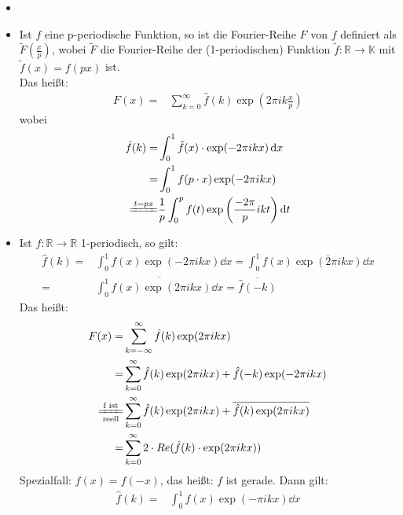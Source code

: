 \begin{Bemerkung}{
	\begin{itemize}
		\item[ ]
		\item Ist $f$ eine p-periodische Funktion, so ist die Fourier-Reihe $F$ 
		von $f$ definiert als $\tilde{F}(\frac{x}{p})$, wobei $\tilde{F}$ die 
		Fourier-Reihe der (1-periodischen) Funktion $\tilde{f}: \mathbb{R} 
		\rightarrow \mathbb{K}$ mit $\tilde{f}(x) = f(px)$ ist. \\
		Das heißt:
		\begin{align*}
			F(x) = & \sum_{k=0}^{\infty} \hat{f}(k) \exp\left( 2\pi i k 
				\frac{x}{p}\right)
		\end{align*}
		wobei
		\begin{align*}
			\hat{f} (k) = & \int_0^1 \tilde{f}(x) \cdot 
				\exp(-2\pi i k x) \dd{x} \\
			 = & \int_0^1 f(p\cdot x)\exp(-2\pi i k x) \\
			\xlongequal{t = px} & \frac{1}{p}\int_0^p f(t) 
			\exp\left( \frac{-2\pi}{p}ikt \right) \dd{t}
		\end{align*}
		\item Ist $f: \mathbb{R} \rightarrow \mathbb{R}$ 1-periodisch, so 
		gilt:
		\begin{align*}
			\hat{f}(k) = & \int_0^1 f(x) \exp( -2\pi i k x) \dd{x}	
			= \int_0^1 f(x) \overline{\exp(2\pi i k x)} \dd{x} \\
			= & \overline{\int_0^1 f(x) \exp(2\pi i k x) \dd{x}} = 
			\overline{\hat{f}(-k)}			
		\end{align*}		
		Das heißt:
		\begin{align}
			F(x) = & \sum_{k= - \infty}^{\infty} \hat{f}(k) \exp(2\pi i k x) 
				\notag \\ 
			= &\sum_{k=0}^{\infty} \hat{f}(k) \exp(2\pi ikx) + \hat{f}(-k) 
			\exp(-2\pi i kx) \notag \\
			\xlongequal[\text{reell}]{\text{f ist}} &
			\sum_{k=0}^{\infty} \hat{f}(k)\exp(2\pi ikx) 
				+ \overline{\hat{f}(k) \exp(2\pi ikx)} \notag \\ 
			= & \sum_{k=0}^{\infty} 2 \cdot Re(\hat{f}(k) \cdot 
			\exp(2\pi i kx)) \label{vl_19_gl_1}
		\end{align}
		Spezialfall: $f(x) = f(-x)$, das heißt: $f$ ist gerade. Dann gilt:
		\begin{align*}
			\hat{f}(k) = & \int_0^1 f(x) \exp(-\pi ikx) \dd{x} \\

\end{align*}
\end{itemize}}
\end{Bemerkung}
